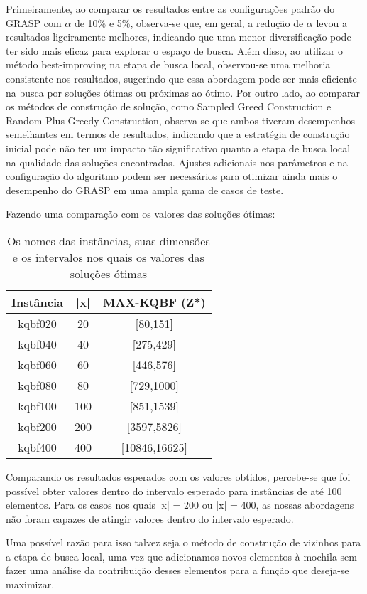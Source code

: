 \documentclass{article}
\begin{document}
Primeiramente, ao comparar os resultados entre as configurações padrão do GRASP com $\alpha$ de 10\% e 5\%, observa-se que, em geral, a redução de $\alpha$ levou a resultados ligeiramente melhores, indicando que uma menor diversificação pode ter sido mais eficaz para explorar o espaço de busca. Além disso, ao utilizar o método best-improving na etapa de busca local, observou-se uma melhoria consistente nos resultados, sugerindo que essa abordagem pode ser mais eficiente na busca por soluções ótimas ou próximas ao ótimo. Por outro lado, ao comparar os métodos de construção de solução, como Sampled Greed Construction e Random Plus Greedy Construction, observa-se que ambos tiveram desempenhos semelhantes em termos de resultados, indicando que a estratégia de construção inicial pode não ter um impacto tão significativo quanto a etapa de busca local na qualidade das soluções encontradas. Ajustes adicionais nos parâmetros e na configuração do algoritmo podem ser necessários para otimizar ainda mais o desempenho do GRASP em uma ampla gama de casos de teste.

Fazendo uma comparação com os valores das soluções ótimas:

\begin{table}[htbp]
\centering
\begin{tabular}{|c|c|c|}
\hline
\textbf{Instância} & \textbf{|x|} & 
\textbf{MAX-KQBF (Z*)} \\
\hline
kqbf020 & 20 & [80,151] \\
kqbf040 & 40 & [275,429] \\
kqbf060 & 60 & [446,576] \\
kqbf080 & 80 & [729,1000] \\
kqbf100 & 100 & [851,1539] \\
kqbf200 & 200 & [3597,5826] \\
kqbf400 & 400 & [10846,16625] \\

\hline
\end{tabular}
\caption{Os nomes das instâncias,
suas dimensões e os intervalos nos quais os valores das soluções ótimas}
\label{tab:minha_tabela}
\end{table}

Comparando os resultados esperados com os valores obtidos, percebe-se que foi possível obter valores dentro do intervalo esperado para instâncias de até 100 elementos. Para os casos nos quais |x| = 200 ou |x| = 400, as nossas abordagens não foram capazes de atingir valores dentro do intervalo esperado.

Uma possível razão para isso talvez seja o método de construção de vizinhos para a etapa de busca local, uma vez que adicionamos novos elementos à mochila sem fazer uma análise da contribuição desses elementos para a função que deseja-se maximizar.
\end{document}

